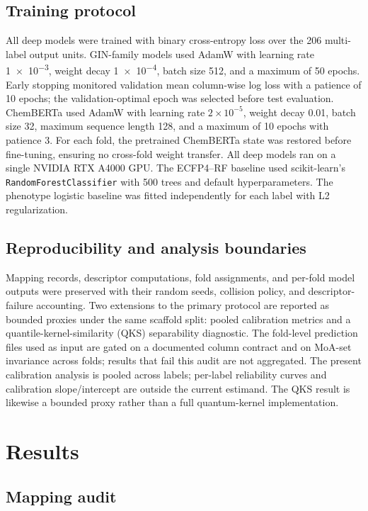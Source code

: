 \documentclass[11pt,a4paper]{article}
\begin{document}
\subsection{Training protocol}

All deep models were trained with binary cross-entropy loss over the \num{206} multi-label output units. GIN-family models used AdamW with learning rate \num{1e-3}, weight decay \num{1e-4}, batch size \num{512}, and a maximum of \num{50} epochs. Early stopping monitored validation mean column-wise log loss with a patience of \num{10} epochs; the validation-optimal epoch was selected before test evaluation. ChemBERTa used AdamW with learning rate $2\times 10^{-5}$, weight decay \num{0.01}, batch size \num{32}, maximum sequence length \num{128}, and a maximum of \num{10} epochs with patience \num{3}. For each fold, the pretrained ChemBERTa state was restored before fine-tuning, ensuring no cross-fold weight transfer. All deep models ran on a single NVIDIA RTX A4000 GPU. The ECFP4--RF baseline used scikit-learn's \texttt{RandomForestClassifier} with \num{500} trees and default hyperparameters. The phenotype logistic baseline was fitted independently for each label with L2 regularization.

\subsection{Reproducibility and analysis boundaries}

Mapping records, descriptor computations, fold assignments, and per-fold model outputs were preserved with their random seeds, collision policy, and descriptor-failure accounting. Two extensions to the primary protocol are reported as bounded proxies under the same scaffold split: pooled calibration metrics and a quantile-kernel-similarity (QKS) separability diagnostic. The fold-level prediction files used as input are gated on a documented column contract and on MoA-set invariance across folds; results that fail this audit are not aggregated. The present calibration analysis is pooled across labels; per-label reliability curves and calibration slope/intercept are outside the current estimand. The QKS result is likewise a bounded proxy rather than a full quantum-kernel implementation.

\section{Results}

\subsection{Mapping audit}
\end{document}
